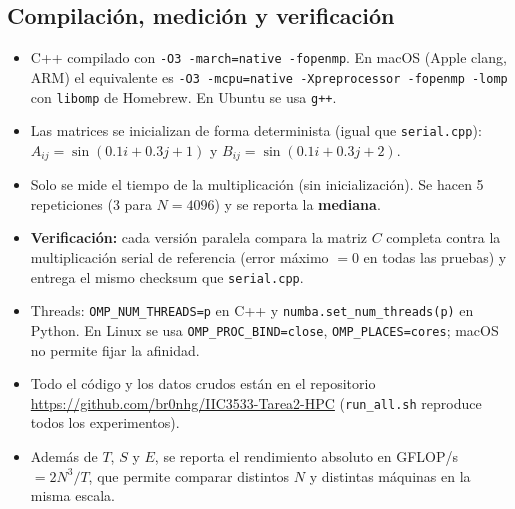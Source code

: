 \documentclass[11pt,a4paper]{article}
\begin{document}
\subsection{Compilación, medición y verificación}
\begin{itemize}
  \item C++ compilado con \texttt{-O3 -march=native -fopenmp}. En macOS (Apple clang, ARM) el equivalente es \texttt{-O3 -mcpu=native -Xpreprocessor -fopenmp -lomp} con \texttt{libomp} de Homebrew. En Ubuntu se usa \texttt{g++}.
  \item Las matrices se inicializan de forma determinista (igual que \texttt{serial.cpp}): $A_{ij}=\sin(0.1i+0.3j+1)$ y $B_{ij}=\sin(0.1i+0.3j+2)$.
  \item Solo se mide el tiempo de la multiplicación (sin inicialización). Se hacen 5 repeticiones (3 para $N=4096$) y se reporta la \textbf{mediana}.
  \item \textbf{Verificación:} cada versión paralela compara la matriz $C$ completa contra la multiplicación serial de referencia (error máximo $=0$ en todas las pruebas) y entrega el mismo checksum que \texttt{serial.cpp}.
  \item Threads: \texttt{OMP\_NUM\_THREADS=p} en C++ y \texttt{numba.set\_num\_threads(p)} en Python. En Linux se usa \texttt{OMP\_PROC\_BIND=close}, \texttt{OMP\_PLACES=cores}; macOS no permite fijar la afinidad.
  \item Todo el código y los datos crudos están en el repositorio \url{https://github.com/br0nhg/IIC3533-Tarea2-HPC} (\texttt{run\_all.sh} reproduce todos los experimentos).
  \item Además de $T$, $S$ y $E$, se reporta el rendimiento absoluto en GFLOP/s $=2N^3/T$, que permite comparar distintos $N$ y distintas máquinas en la misma escala.
\end{itemize}

\end{document}
